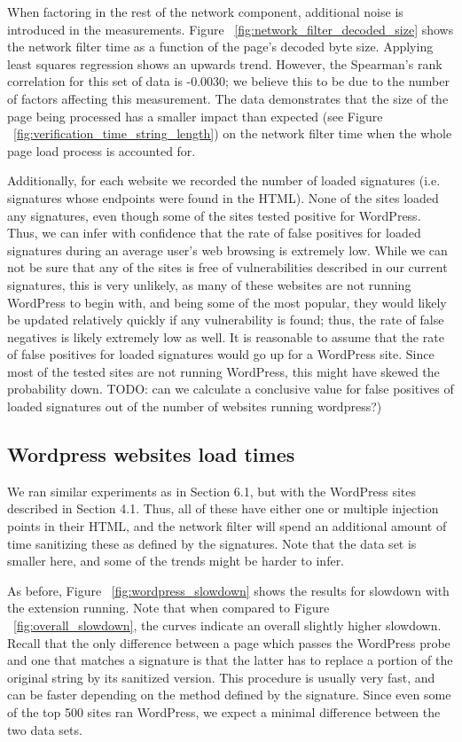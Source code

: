 When factoring in the rest of the network component, additional noise is introduced in the measurements. Figure ~\ref{fig:network_filter_decoded_size} shows the network filter time as a function of the page's decoded byte size. Applying least squares regression shows an upwards trend. However, the Spearman's rank correlation for this set of data is -0.0030; we believe this to be due to the number of factors affecting this measurement. The data demonstrates that the size of the page being processed has a smaller impact than expected (see Figure ~\ref{fig:verification_time_string_length}) on the network filter time when the whole page load process is accounted for.

Additionally, for each website we recorded the number of loaded signatures (i.e. signatures whose endpoints were found in the HTML). None of the sites loaded any signatures, even though some of the sites tested positive for WordPress. Thus, we can infer with confidence that the rate of false positives for loaded signatures during an average user's web browsing is extremely low. While we can not be sure that any of the sites is free of vulnerabilities described in our current signatures, this is very unlikely, as many of these websites are not running WordPress to begin with, and being some of the most popular, they would likely be updated relatively quickly if any vulnerability is found; thus, the rate of false negatives is likely extremely low as well. It is reasonable to assume that the rate of false positives for loaded signatures would go up for a WordPress site. Since most of the tested sites are not running WordPress, this might have skewed the probability down. TODO: can we calculate a conclusive value for false positives of loaded signatures out of the number of websites running wordpress?)

\subsection{Wordpress websites load times}

We ran similar experiments as in Section 6.1, but with the WordPress sites described in Section 4.1. Thus, all of these have either one or multiple injection points in their HTML, and the network filter will spend an additional amount of time sanitizing these as defined by the signatures. Note that the data set is smaller here, and some of the trends might be harder to infer. 

As before, Figure ~\ref{fig:wordpress_slowdown} shows the results for slowdown with the extension running. Note that when compared to Figure ~\ref{fig:overall_slowdown}, the curves indicate an overall slightly higher slowdown. Recall that the only difference between a page which passes the WordPress probe and one that matches a signature is that the latter has to replace a portion of the original string by its sanitized version. This procedure is usually very fast, and can be faster depending on the method defined by the signature. Since even some of the top 500 sites ran WordPress, we expect a minimal difference between the two data sets.

